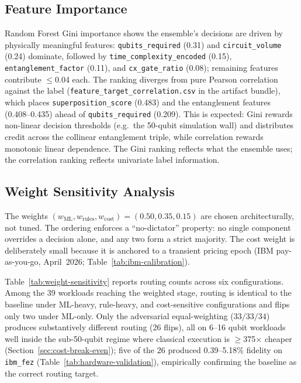 \documentclass[10pt,conference]{IEEEtran}
\begin{document}
\subsection{Feature Importance}

Random Forest Gini importance shows the ensemble's decisions are driven by physically meaningful features: \texttt{qubits\_required} (0.31) and \texttt{circuit\_volume} (0.24) dominate, followed by \texttt{time\_complexity\_encoded} (0.15), \texttt{entanglement\_factor} (0.11), and \texttt{cx\_gate\_ratio} (0.08); remaining features contribute $\leq$0.04 each. The ranking diverges from pure Pearson correlation against the label (\texttt{feature\_target\_correlation.csv} in the artifact bundle), which places \texttt{superposition\_score} (0.483) and the entanglement features (0.408--0.435) ahead of \texttt{qubits\_required} (0.209). This is expected: Gini rewards non-linear decision thresholds (e.g.\ the 50-qubit simulation wall) and distributes credit across the collinear entanglement triple, while correlation rewards monotonic linear dependence. The Gini ranking reflects what the ensemble uses; the correlation ranking reflects univariate label information.

\subsection{Weight Sensitivity Analysis}

The weights $(w_{\text{ML}}, w_{\text{rules}}, w_{\text{cost}}) = (0.50, 0.35, 0.15)$ are chosen architecturally, not tuned. The ordering enforces a ``no-dictator'' property: no single component overrides a decision alone, and any two form a strict majority. The cost weight is deliberately small because it is anchored to a transient pricing epoch (IBM pay-as-you-go, April~2026; Table~\ref{tab:ibm-calibration}).

Table~\ref{tab:weight-sensitivity} reports routing counts across six configurations. Among the 39 workloads reaching the weighted stage, routing is identical to the baseline under ML-heavy, rule-heavy, and cost-sensitive configurations and flips only two under ML-only. Only the adversarial equal-weighting ($33/33/34$) produces substantively different routing (26 flips), all on 6--16 qubit workloads well inside the sub-50-qubit regime where classical execution is $\geq$375$\times$ cheaper (Section~\ref{sec:cost-break-even}); five of the 26 produced 0.39--5.18\% fidelity on \texttt{ibm\_fez} (Table~\ref{tab:hardware-validation}), empirically confirming the baseline as the correct routing target.
\end{document}
